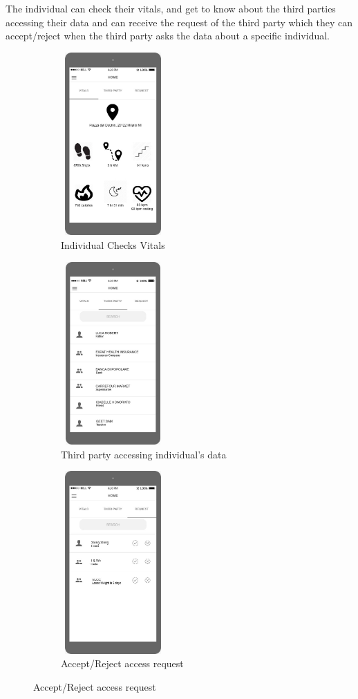 The individual can check their vitals, and get to know about the third parties accessing their data and can receive the request of the third party which they can accept/reject when the third party asks the data about a specific individual.

\begin{figure}[H]
	\centering
	\begin{subfigure}[b]{0.3\textwidth}	
		\includegraphics[width=4cm,height=7cm]		{./Mockups/3_I-Home.jpeg}
      	\caption{Individual Checks Vitals}
        \label{TrackMe_vitals}
	 \end{subfigure}
     \begin{subfigure}[b]{0.3\textwidth}	
		\includegraphics[width=4cm,height=7cm]		{./Mockups/4_I-DetailsOfThirdParty.jpeg}
      	\caption{Third party accessing individual's data}
        \label{TrackMe_3party}
	 \end{subfigure}
     \begin{subfigure}[b]{0.3\textwidth}	
		\includegraphics[width=4cm,height=7cm]		{./Mockups/5_I-Request.jpeg}
      	\caption{Accept/Reject access request}
        \label{TrackMe_acerej}
	 \end{subfigure}
\end{figure}

